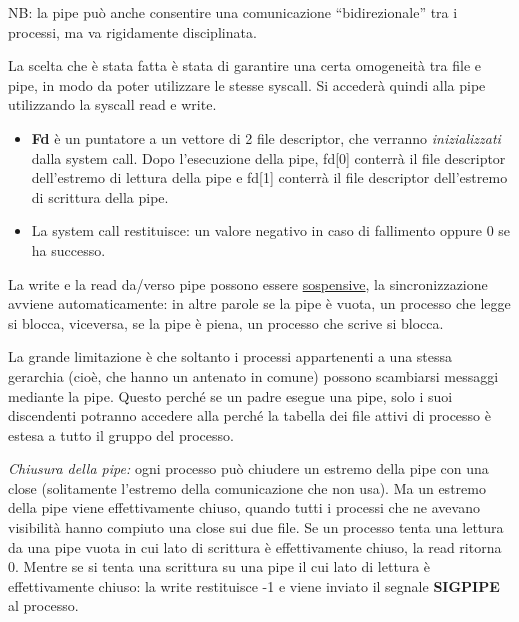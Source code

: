 \documentclass{article}
\begin{document}
\noindent NB: la pipe può anche consentire una comunicazione “bidirezionale”
 tra i processi, ma va rigidamente disciplinata.

\noindent La scelta che è stata fatta è stata di garantire
una certa omogeneità tra file e pipe, in modo da poter
utilizzare le stesse syscall. Si accederà quindi alla pipe
utilizzando la syscall read e write.
\medskip

\noindent {} 

\begin{itemize}
    \item \textbf{Fd} è un puntatore a un vettore di 2 file 
    descriptor, che verranno \textit{inizializzati} dalla
    system call. Dopo l'esecuzione della pipe, fd[0] conterrà
    il file descriptor dell'estremo di lettura della pipe e
    fd[1] conterrà il file descriptor dell'estremo di
    scrittura della pipe.
    \item  La system call restituisce: un valore negativo
     in caso di fallimento oppure 0 se ha successo.
\end{itemize}

\noindent La write e la read
 da/verso pipe possono essere \underline{sospensive},
 la sincronizzazione avviene automaticamente: in altre parole
 se la pipe è vuota, un processo che legge si
 blocca, viceversa, se la pipe è piena, un processo che scrive
 si blocca.

 \noindent La grande limitazione è che soltanto i processi
 appartenenti a una stessa gerarchia (cioè, che hanno un antenato in comune)
 possono scambiarsi messaggi mediante la pipe. Questo perché se un
 padre esegue una pipe, solo i suoi discendenti potranno accedere alla
 perché la tabella dei file attivi di processo è estesa a
 tutto il gruppo del processo.
 \medskip

 \noindent \textit{Chiusura della pipe:}
 ogni processo può chiudere un estremo della pipe con una
 close (solitamente l'estremo della comunicazione che non usa).
 Ma un estremo della pipe viene effettivamente chiuso, quando tutti
 i processi che ne avevano visibilità hanno compiuto una close sui due file.
 Se un processo tenta una lettura da una pipe vuota in cui
 lato di scrittura è effettivamente chiuso, la read ritorna 0.
 Mentre se si tenta una scrittura su una pipe il cui lato di lettura
 è effettivamente chiuso: la write restituisce -1 e viene inviato 
 il segnale \textbf{SIGPIPE} al processo.
\medskip
\end{document}
